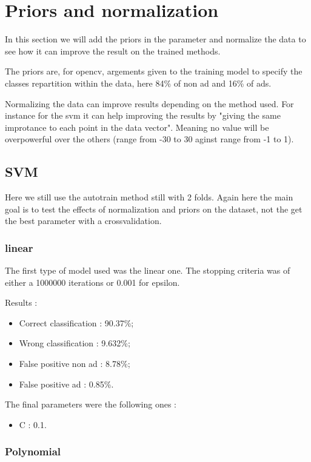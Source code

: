 \section{Priors and normalization}

In this section we will add the priors in the parameter and normalize the data to see how it can improve the result on the trained methods.

The priors are, for opencv, argements given to the training model to specify the classes repartition within the data, here 84\% of non ad and 16\% of ads.

Normalizing the data can improve results depending on the method used. For instance for the svm it can help improving the results by "giving the same improtance to each point in the data vector". Meaning no value will be overpowerful over the others (range from -30 to 30 aginst range from -1 to 1).

\subsection{SVM}

Here we still use the autotrain method still with 2 folds. Again here the main goal is to test the effects of normalization and priors on the dataset, not the get the best parameter with a crossvalidation.

\subsubsection{linear}

The first type of model used was the linear one. The stopping criteria was of either a 1000000 iterations or 0.001 for epsilon.

Results :
\begin{itemize}
  \item Correct classification : 90.37\%;
  \item Wrong classification : 9.632\%;
  \item False positive non ad : 8.78\%;
  \item False positive ad : 0.85\%.
\end{itemize}

The final parameters were the following ones :
\begin{itemize}
  \item C : 0.1.
\end{itemize}

\subsubsection{Polynomial}

